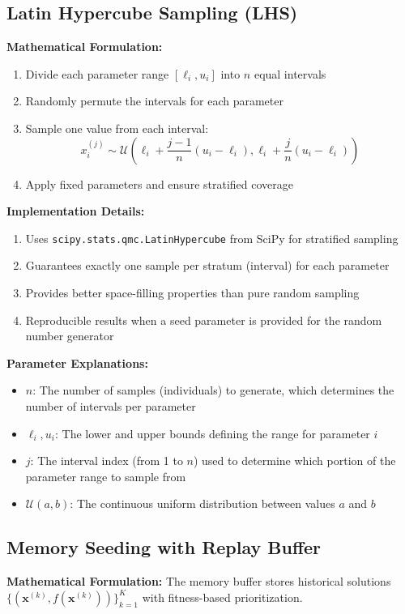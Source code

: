 \documentclass[12pt,a4paper]{article}
\begin{document}
\subsection{Latin Hypercube Sampling (LHS)}
\textbf{Mathematical Formulation:}
\begin{enumerate}
\item Divide each parameter range $[\ell_i, u_i]$ into $n$ equal intervals
\item Randomly permute the intervals for each parameter
\item Sample one value from each interval:
\begin{equation}
x_i^{(j)} \sim \mathcal{U}\left(\ell_i + \frac{j-1}{n}(u_i - \ell_i), \ell_i + \frac{j}{n}(u_i - \ell_i)\right) \label{eq:lhs_sampling}
\end{equation}
\item Apply fixed parameters and ensure stratified coverage
\end{enumerate}

\textbf{Implementation Details:}
\begin{enumerate}
\item Uses \texttt{scipy.stats.qmc.LatinHypercube} from SciPy for stratified sampling
\item Guarantees exactly one sample per stratum (interval) for each parameter
\item Provides better space-filling properties than pure random sampling
\item Reproducible results when a seed parameter is provided for the random number generator
\end{enumerate}

\textbf{Parameter Explanations:}
\begin{itemize}
\item $n$: The number of samples (individuals) to generate, which determines the number of intervals per parameter
\item $\ell_i, u_i$: The lower and upper bounds defining the range for parameter $i$
\item $j$: The interval index (from 1 to $n$) used to determine which portion of the parameter range to sample from
\item $\mathcal{U}(a,b)$: The continuous uniform distribution between values $a$ and $b$
\end{itemize}

\subsection{Memory Seeding with Replay Buffer}
\textbf{Mathematical Formulation:}
The memory buffer stores historical solutions $\{(\bm{x}^{(k)}, f(\bm{x}^{(k)}))\}_{k=1}^K$ with fitness-based prioritization.
\end{document}
